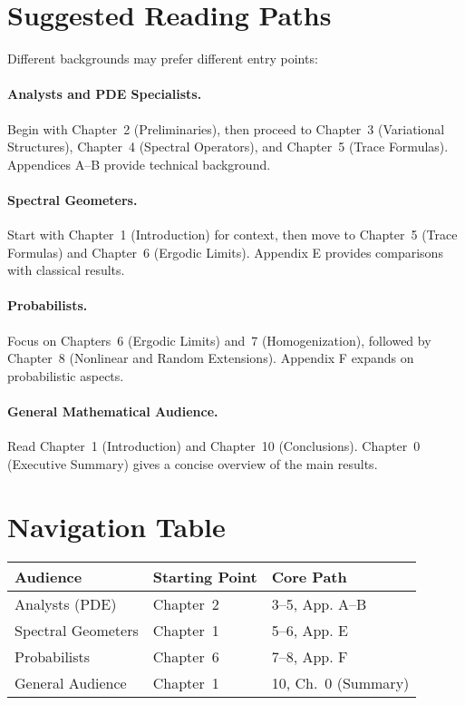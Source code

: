 \section*{Suggested Reading Paths}

Different backgrounds may prefer different entry points:

\paragraph{Analysts and PDE Specialists.}
Begin with Chapter~2 (Preliminaries), then proceed to Chapter~3 (Variational Structures), 
Chapter~4 (Spectral Operators), and Chapter~5 (Trace Formulas). Appendices A–B provide 
technical background.

\paragraph{Spectral Geometers.}
Start with Chapter~1 (Introduction) for context, then move to Chapter~5 (Trace Formulas) 
and Chapter~6 (Ergodic Limits). Appendix E provides comparisons with classical results.

\paragraph{Probabilists.}
Focus on Chapters~6 (Ergodic Limits) and~7 (Homogenization), followed by Chapter~8 
(Nonlinear and Random Extensions). Appendix F expands on probabilistic aspects.

\paragraph{General Mathematical Audience.}
Read Chapter~1 (Introduction) and Chapter~10 (Conclusions). 
Chapter~0 (Executive Summary) gives a concise overview of the main results.

\section*{Navigation Table}

\begin{center}
\begin{tabular}{|l|l|l|}
\hline
Audience & Starting Point & Core Path \\
\hline
Analysts (PDE) & Chapter~2 & 3–5, App. A–B \\
Spectral Geometers & Chapter~1 & 5–6, App. E \\
Probabilists & Chapter~6 & 7–8, App. F \\
General Audience & Chapter~1 & 10, Ch.~0 (Summary) \\
\hline
\end{tabular}
\end{center}

